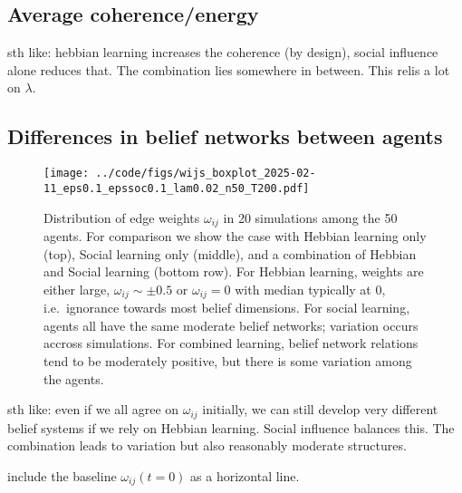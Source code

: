 \documentclass[10pt]{article}
\begin{document}
\FloatBarrier
\subsection{Average coherence/energy}

\TODO  

sth like: hebbian learning increases the coherence (by design), social influence alone reduces that. The combination lies somewhere in between. This relis a lot on $\lambda$.


\FloatBarrier
\subsection{Differences in belief networks between agents}

\begin{figure}[h!]
    \centering
    \texttt{[image: ../code/figs/wijs\_boxplot\_2025-02-11\_eps0.1\_epssoc0.1\_lam0.02\_n50\_T200.pdf]}
    \caption{Distribution of edge weights $\omega_{ij}$ in 20 simulations among the 50 agents. For comparison we show the case with Hebbian learning only (top), Social learning only (middle), and a combination of Hebbian and Social learning (bottom row). For Hebbian learning, weights are either large, $\omega_{ij} \sim \pm 0.5$ or $\omega_{ij}=0$ with median typically at $0$, i.e.\ ignorance towards most belief dimensions. For social learning, agents all have the same moderate belief networks; variation occurs accross simulations. For combined learning, belief network relations tend to be moderately positive, but there is some variation among the agents.}
    \label{fig:}
\end{figure}

sth like: even if we all agree on $\omega_{ij}$ initially, we can still develop very different belief systems if we rely on Hebbian learning. Social influence balances this. The combination leads to variation but also reasonably moderate structures. 

\TODO include the baseline $\omega_{ij}(t=0)$ as a horizontal line.
\end{document}
